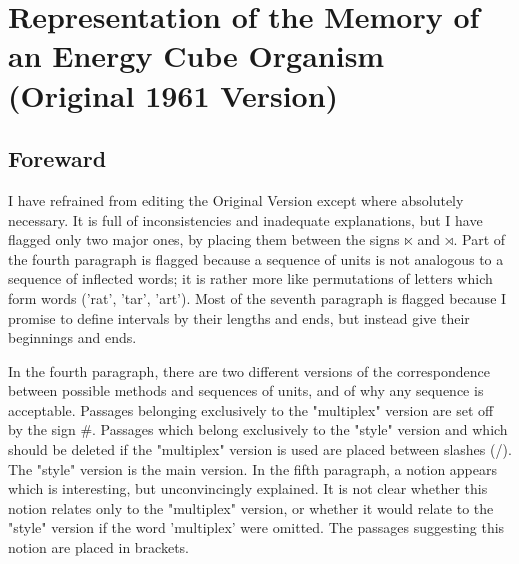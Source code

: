 \chapter{Representation of the Memory of an Energy Cube Organism (Original 1961 Version)}

\section*{Foreward}

I have refrained from editing the Original Version except where 
absolutely necessary. It is full of inconsistencies and inadequate 
explanations, but I have flagged only two major ones, by placing them 
between the signs $\ltimes$ and $\rtimes$. Part of the fourth paragraph is flagged because a 
sequence of units is not analogous to a sequence of inflected words; it is 
rather more like permutations of letters which form words ('rat', 'tar', 'art'). 
Most of the seventh paragraph is flagged because I promise to define intervals 
by their lengths and ends, but instead give their beginnings and ends. 

In the fourth paragraph, there are two different versions of the 
correspondence between possible methods and sequences of units, and of 
why any sequence is acceptable. Passages belonging exclusively to the 
"multiplex" version are set off by the sign \#. Passages which belong 
exclusively to the "style" version and which should be deleted if the 
"multiplex" version is used are placed between slashes (\slash). The "style" version is 
the main version. In the fifth paragraph, a notion appears which is 
interesting, but unconvincingly explained. It is not clear whether this notion 
relates only to the "multiplex" version, or whether it would relate to the 
"style" version if the word 'multiplex' were omitted. The passages suggesting 
this notion are placed in brackets. 

